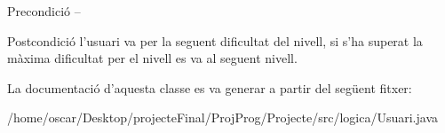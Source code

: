 \begin{DoxyPrecond}{Precondició}
-- 
\end{DoxyPrecond}
\begin{DoxyPostcond}{Postcondició}
l'usuari va per la seguent dificultat del nivell, si s'ha superat la màxima dificultat per el nivell es va al seguent nivell. 
\end{DoxyPostcond}


La documentació d'aquesta classe es va generar a partir del següent fitxer\+:\begin{DoxyCompactItemize}
\item 
/home/oscar/\+Desktop/projecte\+Final/\+Proj\+Prog/\+Projecte/src/logica/Usuari.\+java\end{DoxyCompactItemize}
